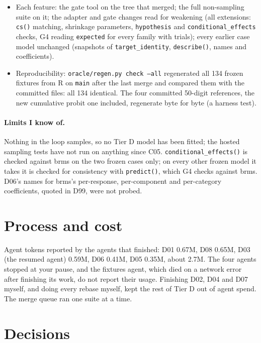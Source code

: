 \documentclass[11pt]{article}
\newcommand{\code}[1]{\texttt{#1}}
\begin{document}
\begin{itemize}
\item Each feature: the gate tool on the tree that merged; the full non-sampling suite on it; the adapter and gate changes
  read for weakening (all extensions: \code{cs()} matching, shrinkage parameters, \code{hypothesis} and
  \code{conditional\_effects} checks, G4 reading \code{expected} for every family with trials); every earlier case model
  unchanged (snapshots of \code{target\_identity}, \code{describe()}, names and coefficients).
\item Reproducibility: \code{oracle/regen.py check --all} regenerated all 134 frozen fixtures from R on \code{main} after the last
  merge and compared them with the committed files: all 134 identical. The four committed 50-digit references,
  the new cumulative probit one included, regenerate byte for byte (a harness test).
\end{itemize}

\paragraph{Limits I know of.} Nothing in the loop samples, so no Tier D model has been fitted; the hosted sampling tests
have not run on anything since C05. \code{conditional\_effects()} is checked against brms on the two frozen cases only;
on every other frozen model it takes it is checked for consistency with \code{predict()}, which G4 checks against
  brms.
D06's names for brms's per-response, per-component and per-category coefficients, quoted in D99, were not probed.

\section{Process and cost}
\label{sec:cost}

Agent tokens reported by the agents that finished: D01 0.67M, D08 0.65M, D03 (the resumed agent) 0.59M, D06 0.41M, D05
0.35M, about 2.7M. The four agents stopped at your pause, and the fixtures agent, which died on a network error after
finishing its work, do not report their usage. Finishing D02, D04 and D07 myself, and doing every rebase myself, kept
the rest of Tier D out of agent spend. The merge queue ran one suite at a time.

\section{Decisions}
\label{sec:decisions}
\end{document}

